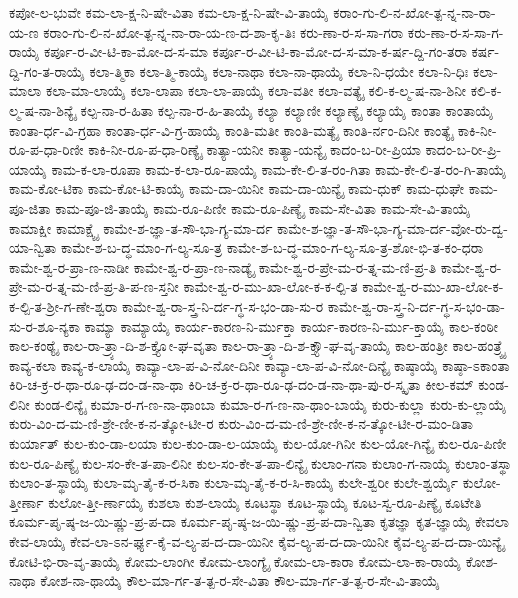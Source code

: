{ಕಪೋ-ಲ-ಭುವೇ
ಕಮ-ಲಾ-ಕ್ಷ-ನಿ-ಷೇ-ವಿತಾ
ಕಮ-ಲಾ-ಕ್ಷ-ನಿ-ಷೇ-ವಿ-ತಾಯೈ
ಕರಾಂ-ಗು-ಲಿ-ನ-ಖೋ-ತ್ಪ-ನ್ನ-ನಾ-ರಾ-ಯ-ಣ
ಕರಾಂ-ಗು-ಲಿ-ನ-ಖೋ-ತ್ಪ-ನ್ನ-ನಾ-ರಾ-ಯ-ಣ-ದ-ಶಾ-ಕೃ-ತಿಃ
ಕರು-ಣಾ-ರ-ಸ-ಸಾ-ಗರಾ
ಕರು-ಣಾ-ರ-ಸ-ಸಾ-ಗ-ರಾಯೈ
ಕರ್ಪೂ-ರ-ವೀ-ಟಿ-ಕಾ-ಮೋ-ದ-ಸ-ಮಾ
ಕರ್ಪೂ-ರ-ವೀ-ಟಿ-ಕಾ-ಮೋ-ದ-ಸ-ಮಾ-ಕ-ರ್ಷ-ದ್ದಿ-ಗಂ-ತರಾ
ಕರ್ಷ-ದ್ದಿ-ಗಂ-ತ-ರಾಯೈ
ಕಲಾ-ತ್ಮಿಕಾ
ಕಲಾ-ತ್ಮಿ-ಕಾಯೈ
ಕಲಾ-ನಾಥಾ
ಕಲಾ-ನಾ-ಥಾಯೈ
ಕಲಾ-ನಿ-ಧಯೇ
ಕಲಾ-ನಿ-ಧಿಃ
ಕಲಾ-ಮಾಲಾ
ಕಲಾ-ಮಾ-ಲಾಯೈ
ಕಲಾ-ಲಾಪಾ
ಕಲಾ-ಲಾ-ಪಾಯೈ
ಕಲಾ-ವತೀ
ಕಲಾ-ವತ್ಯೈ
ಕಲಿ-ಕ-ಲ್ಮ-ಷ-ನಾ-ಶಿನೀ
ಕಲಿ-ಕ-ಲ್ಮ-ಷ-ನಾ-ಶಿನ್ಯೈ
ಕಲ್ಪ-ನಾ-ರ-ಹಿತಾ
ಕಲ್ಪ-ನಾ-ರ-ಹಿ-ತಾಯೈ
ಕಲ್ಯಾ
ಕಲ್ಯಾಣೀ
ಕಲ್ಯಾಣ್ಯೈ
ಕಲ್ಯಾಯೈ
ಕಾಂತಾ
ಕಾಂತಾಯೈ
ಕಾಂತಾ-ರ್ಧ-ವಿ-ಗ್ರಹಾ
ಕಾಂತಾ-ರ್ಧ-ವಿ-ಗ್ರ-ಹಾಯೈ
ಕಾಂತಿ-ಮತೀ
ಕಾಂತಿ-ಮತ್ಯೈ
ಕಾಂತಿ-ರ್ನಂ-ದಿನೀ
ಕಾಂತ್ಯೈ
ಕಾಕಿ-ನೀ-ರೂ-ಪ-ಧಾ-ರಿಣೀ
ಕಾಕಿ-ನೀ-ರೂ-ಪ-ಧಾ-ರಿಣ್ಯೈ
ಕಾತ್ಯಾ-ಯನೀ
ಕಾತ್ಯಾ-ಯನ್ಯೈ
ಕಾದಂ-ಬ-ರೀ-ಪ್ರಿಯಾ
ಕಾದಂ-ಬ-ರೀ-ಪ್ರಿ-ಯಾಯೈ
ಕಾಮ-ಕ-ಲಾ-ರೂಪಾ
ಕಾಮ-ಕ-ಲಾ-ರೂ-ಪಾಯೈ
ಕಾಮ-ಕೇ-ಲಿ-ತ-ರಂ-ಗಿತಾ
ಕಾಮ-ಕೇ-ಲಿ-ತ-ರಂ-ಗಿ-ತಾಯೈ
ಕಾಮ-ಕೋ-ಟಿಕಾ
ಕಾಮ-ಕೋ-ಟಿ-ಕಾಯೈ
ಕಾಮ-ದಾ-ಯಿನೀ
ಕಾಮ-ದಾ-ಯಿನ್ಯೈ
ಕಾಮ-ಧುಕ್
ಕಾಮ-ಧುಘೇ
ಕಾಮ-ಪೂ-ಜಿತಾ
ಕಾಮ-ಪೂ-ಜಿ-ತಾಯೈ
ಕಾಮ-ರೂ-ಪಿಣೀ
ಕಾಮ-ರೂ-ಪಿಣ್ಯೈ
ಕಾಮ-ಸೇ-ವಿತಾ
ಕಾಮ-ಸೇ-ವಿ-ತಾಯೈ
ಕಾಮಾಕ್ಷೀ
ಕಾಮಾಕ್ಷ್ಯೈ
ಕಾಮೇ-ಶ-ಜ್ಞಾ-ತ-ಸೌ-ಭಾ-ಗ್ಯ-ಮಾ-ರ್ದ
ಕಾಮೇ-ಶ-ಜ್ಞಾ-ತ-ಸೌ-ಭಾ-ಗ್ಯ-ಮಾ-ರ್ದ-ವೋ-ರು-ದ್ವ-ಯಾ-ನ್ವಿತಾ
ಕಾಮೇ-ಶ-ಬ-ದ್ಧ-ಮಾಂ-ಗ-ಲ್ಯ-ಸೂ-ತ್ರ
ಕಾಮೇ-ಶ-ಬ-ದ್ಧ-ಮಾಂ-ಗ-ಲ್ಯ-ಸೂ-ತ್ರ-ಶೋ-ಭಿ-ತ-ಕಂ-ಧರಾ
ಕಾಮೇ-ಶ್ವ-ರ-ಪ್ರಾ-ಣ-ನಾಡೀ
ಕಾಮೇ-ಶ್ವ-ರ-ಪ್ರಾ-ಣ-ನಾಡ್ಯೈ
ಕಾಮೇ-ಶ್ವ-ರ-ಪ್ರೇ-ಮ-ರ-ತ್ನ-ಮ-ಣಿ-ಪ್ರ-ತಿ
ಕಾಮೇ-ಶ್ವ-ರ-ಪ್ರೇ-ಮ-ರ-ತ್ನ-ಮ-ಣಿ-ಪ್ರ-ತಿ-ಪ-ಣ-ಸ್ತನೀ
ಕಾಮೇ-ಶ್ವ-ರ-ಮು-ಖಾ-ಲೋ-ಕ-ಕ-ಲ್ಪಿ-ತ
ಕಾಮೇ-ಶ್ವ-ರ-ಮು-ಖಾ-ಲೋ-ಕ-ಕ-ಲ್ಪಿ-ತ-ಶ್ರೀ-ಗ-ಣೇ-ಶ್ವರಾ
ಕಾಮೇ-ಶ್ವ-ರಾ-ಸ್ತ್ರ-ನಿ-ರ್ದ-ಗ್ಧ-ಸ-ಭಂ-ಡಾ-ಸು-ರ
ಕಾಮೇ-ಶ್ವ-ರಾ-ಸ್ತ್ರ-ನಿ-ರ್ದ-ಗ್ಧ-ಸ-ಭಂ-ಡಾ-ಸು-ರ-ಶೂ-ನ್ಯಕಾ
ಕಾಮ್ಯಾ
ಕಾಮ್ಯಾಯೈ
ಕಾರ್ಯ-ಕಾರಣ-ನಿ-ರ್ಮುಕ್ತಾ
ಕಾರ್ಯ-ಕಾರಣ-ನಿ-ರ್ಮು-ಕ್ತಾಯೈ
ಕಾಲ-ಕಂಠೀ
ಕಾಲ-ಕಂಠ್ಯೈ
ಕಾಲ-ರಾ-ತ್ರ್ಯಾ-ದಿ-ಶ-ಕ್ತ್ಯೋ-ಘ-ವೃತಾ
ಕಾಲ-ರಾ-ತ್ರ್ಯಾ-ದಿ-ಶ-ಕ್ತ್ಯೌ-ಘ-ವೃ-ತಾಯೈ
ಕಾಲ-ಹಂತ್ರೀ
ಕಾಲ-ಹಂತ್ರ್ಯೈ
ಕಾವ್ಯ-ಕಲಾ
ಕಾವ್ಯ-ಕ-ಲಾಯೈ
ಕಾವ್ಯಾ-ಲಾ-ಪ-ವಿ-ನೋ-ದಿನೀ
ಕಾವ್ಯಾ-ಲಾ-ಪ-ವಿ-ನೋ-ದಿನ್ಯೈ
ಕಾಷ್ಠಾಯೈ
ಕಾಷ್ಠಾ-ಽಕಾಂತಾ
ಕಿರಿ-ಚ-ಕ್ರ-ರ-ಥಾ-ರೂ-ಢ-ದಂ-ಡ-ನಾ-ಥಾ
ಕಿರಿ-ಚ-ಕ್ರ-ರ-ಥಾ-ರೂ-ಢ-ದಂ-ಡ-ನಾ-ಥಾ-ಪು-ರ-ಸ್ಕೃತಾ
ಕೀಲ-ಕಮ್
ಕುಂಡ-ಲಿನೀ
ಕುಂಡ-ಲಿನ್ಯೈ
ಕುಮಾ-ರ-ಗ-ಣ-ನಾ-ಥಾಂಬಾ
ಕುಮಾ-ರ-ಗ-ಣ-ನಾ-ಥಾಂ-ಬಾಯೈ
ಕುರು-ಕುಲ್ಲಾ
ಕುರು-ಕು-ಲ್ಲಾಯೈ
ಕುರು-ವಿಂ-ದ-ಮ-ಣಿ-ಶ್ರೇ-ಣೀ-ಕ-ನ-ತ್ಕೋ-ಟೀ-ರ
ಕುರು-ವಿಂ-ದ-ಮ-ಣಿ-ಶ್ರೇ-ಣೀ-ಕ-ನ-ತ್ಕೋ-ಟೀ-ರ-ಮಂ-ಡಿತಾ
ಕುರ್ಯಾತ್
ಕುಲ-ಕುಂ-ಡಾ-ಲಯಾ
ಕುಲ-ಕುಂ-ಡಾ-ಲ-ಯಾಯೈ
ಕುಲ-ಯೋ-ಗಿನೀ
ಕುಲ-ಯೋ-ಗಿನ್ಯೈ
ಕುಲ-ರೂ-ಪಿಣೀ
ಕುಲ-ರೂ-ಪಿಣ್ಯೈ
ಕುಲ-ಸಂ-ಕೇ-ತ-ಪಾ-ಲಿನೀ
ಕುಲ-ಸಂ-ಕೇ-ತ-ಪಾ-ಲಿನ್ಯೈ
ಕುಲಾಂ-ಗನಾ
ಕುಲಾಂ-ಗ-ನಾಯೈ
ಕುಲಾಂ-ತಸ್ಥಾ
ಕುಲಾಂ-ತ-ಸ್ಥಾಯೈ
ಕುಲಾ-ಮೃ-ತೈ-ಕ-ರ-ಸಿಕಾ
ಕುಲಾ-ಮೃ-ತೈ-ಕ-ರ-ಸಿ-ಕಾಯೈ
ಕುಲೇ-ಶ್ವರೀ
ಕುಲೇ-ಶ್ವರ್ಯೈ
ಕುಲೋ-ತ್ತೀರ್ಣಾ
ಕುಲೋ-ತ್ತೀ-ರ್ಣಾಯೈ
ಕುಶಲಾ
ಕುಶ-ಲಾಯೈ
ಕೂಟಸ್ಥಾ
ಕೂಟ-ಸ್ಥಾಯೈ
ಕೂಟ-ಸ್ವ-ರೂ-ಪಿಣ್ಯೈ
ಕೂಟೇತಿ
ಕೂರ್ಮ-ಪೃ-ಷ್ಠ-ಜ-ಯಿ-ಷ್ಣು-ಪ್ರ-ಪ-ದಾ
ಕೂರ್ಮ-ಪೃ-ಷ್ಠ-ಜ-ಯಿ-ಷ್ಣು-ಪ್ರ-ಪ-ದಾ-ನ್ವಿತಾ
ಕೃತಜ್ಞಾ
ಕೃತ-ಜ್ಞಾಯೈ
ಕೇವಲಾ
ಕೇವ-ಲಾಯೈ
ಕೇವ-ಲಾ-ಽನ-ರ್ಘ್ಯ-ಕೈ-ವ-ಲ್ಯ-ಪ-ದ-ದಾ-ಯಿನೀ
ಕೈವ-ಲ್ಯ-ಪ-ದ-ದಾ-ಯಿನೀ
ಕೈವ-ಲ್ಯ-ಪ-ದ-ದಾ-ಯಿನ್ಯೈ
ಕೋಟಿ-ಭಿ-ರಾ-ವೃ-ತಾಯೈ
ಕೋಮ-ಲಾಂಗೀ
ಕೋಮ-ಲಾಂಗ್ಯೈ
ಕೋಮ-ಲಾ-ಕಾರಾ
ಕೋಮ-ಲಾ-ಕಾ-ರಾಯೈ
ಕೋಶ-ನಾಥಾ
ಕೋಶ-ನಾ-ಥಾಯೈ
ಕೌಲ-ಮಾ-ರ್ಗ-ತ-ತ್ಪ-ರ-ಸೇ-ವಿತಾ
ಕೌಲ-ಮಾ-ರ್ಗ-ತ-ತ್ಪ-ರ-ಸೇ-ವಿ-ತಾಯೈ
}
